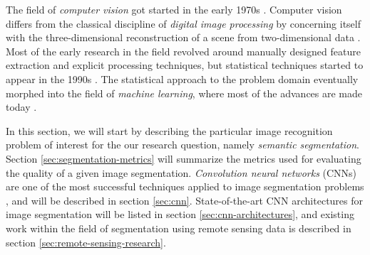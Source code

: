 The field of \textit{computer vision} got started in the early 1970s \cite[p.~10]{computer_vision_history}.
Computer vision differs from the classical discipline of \textit{digital image processing} by concerning itself with the three-dimensional reconstruction of a scene from two-dimensional data \cite[p.~10]{computer_vision_history}.
Most of the early research in the field revolved around manually designed feature extraction and explicit processing techniques, but statistical techniques started to appear in the 1990s \cite[p.~15]{computer_vision_history}.
The statistical approach to the problem domain eventually morphed into the field of \textit{machine learning}, where most of the advances are made today \cite[p.~17]{computer_vision_history}.

In this section, we will start by describing the particular image recognition problem of interest for the our research question, namely \textit{semantic segmentation}.
Section \ref{sec:segmentation-metrics} will summarize the metrics used for evaluating the quality of a given image segmentation.
\textit{Convolution neural networks} (CNNs) are one of the most successful techniques applied to image segmentation problems \cite[p.~1]{image_recognition}, and will be described in section \ref{sec:cnn}.
State-of-the-art CNN architectures for image segmentation will be listed in section \ref{sec:cnn-architectures}, and existing work within the field of segmentation using remote sensing data is described in section \ref{sec:remote-sensing-research}.
